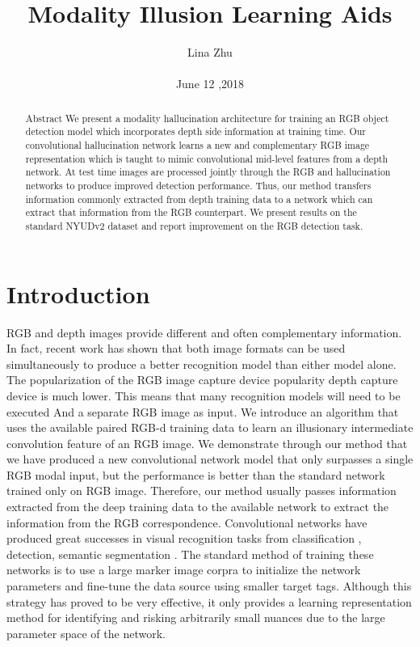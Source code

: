 \documentclass[10pt,twocolumn,letterpaper]{article}
\begin{document}
\title{Modality Illusion Learning Aids}
\author{Lina Zhu\\\\June 12 ,2018}
\maketitle
\begin{abstract}
Abstract
We present a modality hallucination architecture for training an RGB object detection model which incorporates depth side information at training time. Our convolutional hallucination network learns a new and complementary RGB image representation which is taught to mimic convolutional mid-level features from a depth network. At test time images are processed jointly through
the RGB and hallucination networks to produce improved
detection performance. Thus, our method transfers information
commonly extracted from depth training data to a
network which can extract that information from the RGB
counterpart. We present results on the standard NYUDv2
dataset and report improvement on the RGB detection task.
\end{abstract}
\section{Introduction}
RGB and depth images provide different and often complementary information. In fact, recent work has shown that both image formats can be used simultaneously to produce a better recognition model than either model alone\cite{Wang_2014_Weakly}. The popularization of the RGB image capture device popularity depth capture device is much lower. This means that many recognition models will need to be executed
And a separate RGB image as input. We introduce an algorithm that uses the available paired RGB-d training data to learn an illusionary intermediate convolution feature of an RGB image. We demonstrate through our method that we have produced a new convolutional network model that only surpasses a single RGB modal input, but the performance is better than the standard network trained only on RGB
image. Therefore, our method usually passes information extracted from the deep training data to the available network to extract the information from the RGB correspondence. Convolutional networks have produced great successes in visual recognition tasks from classification \cite{Duan_2012_Learning}, detection\cite{Girshick_2014_Rich}, semantic segmentation \cite{Long_2015_Fully}. The standard method of training these networks is to use a large marker image corpra to initialize the network parameters and fine-tune the data source using smaller target tags. Although this strategy has proved to be very effective, it only provides a learning representation method for identifying and risking arbitrarily small nuances due to the large parameter space of the network.
\end{document}
